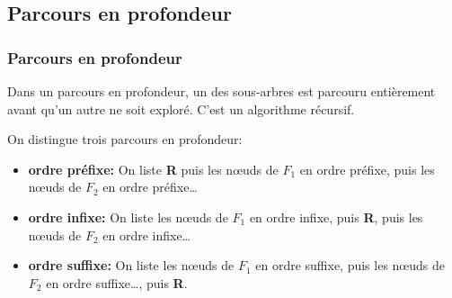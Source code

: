 \documentclass[svgnames,11pt]{beamer}
\begin{document}
\subsection{Parcours en profondeur}
\begin{frame}
    \frametitle{Parcours en profondeur}

    \begin{aretenir}[]
        Dans un parcours en profondeur, un des sous-arbres est parcouru entièrement avant qu'un autre ne soit exploré. C'est un algorithme récursif.
    \end{aretenir}
\end{frame}
\begin{frame}

    \begin{aretenir}[]On distingue trois parcours en profondeur:
        \begin{itemize}
            \item \textbf{ordre préfixe:} On liste \textbf{R} puis les nœuds de \textbf{$F_1$} en ordre préfixe, puis les nœuds de \textbf{$F_2$} en ordre préfixe\dots
            \item \textbf{ordre infixe:} On liste les nœuds de \textbf{$F_1$} en ordre infixe, puis \textbf{R}, puis les nœuds de \textbf{$F_2$} en ordre infixe\dots
            \item \textbf{ordre suffixe:} On liste les nœuds de \textbf{$F_1$} en ordre suffixe, puis les nœuds de \textbf{$F_2$} en ordre suffixe\dots, puis \textbf{R}.
        \end{itemize}
    \end{aretenir}
    \begin{center}

    \end{center}
\end{frame}
\end{document}
